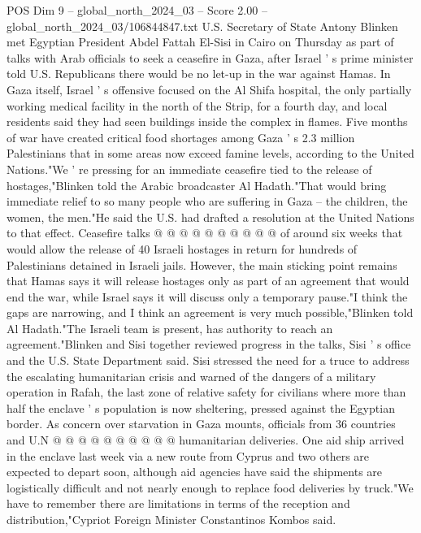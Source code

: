 \begin{textsample}{POS Dim 9 – global\_north\_2024\_03 – Score 2.00 – global\_north\_2024\_03/106844847.txt}  \label{ex:f9_pos_199}
U.S.
Secretary of State Antony Blinken met Egyptian President Abdel Fattah El-Sisi in Cairo on Thursday as part of talks with Arab officials to seek a ceasefire in Gaza, after Israel ' s prime minister told U.S.
Republicans there would be no let-up in the war against Hamas.
In Gaza itself, Israel ' s offensive focused on the Al Shifa hospital, the only partially working medical facility in the north of the Strip, for a fourth day, and local residents said they had seen buildings inside the complex in flames.
Five months of war have created critical food shortages among Gaza ' s 2.3 million Palestinians that in some areas now exceed famine levels, according to the United Nations."We ' re pressing for an immediate ceasefire tied to the release of hostages,"Blinken told the Arabic broadcaster Al Hadath."That would bring immediate relief to so many people who are suffering in Gaza -- the children, the women, the men."He said the U.S. had drafted a resolution at the United Nations to that effect.
Ceasefire talks @ @ @ @ @ @ @ @ @ @ of around six weeks that would allow the release of 40 Israeli hostages in return for hundreds of Palestinians detained in Israeli jails.
However, the main sticking point remains that Hamas says it will release hostages only as part of an agreement that would end the war, while Israel says it will discuss only a temporary pause."I think the gaps are narrowing, and I think an agreement is very much possible,"Blinken told Al Hadath."The Israeli team is present, has authority to reach an agreement."Blinken and Sisi together reviewed progress in the talks, Sisi ' s office and the U.S.
State Department said.
Sisi stressed the need for a truce to address the escalating humanitarian crisis and warned of the dangers of a military operation in Rafah, the last zone of relative safety for civilians where more than half the enclave ' s population is now sheltering, pressed against the Egyptian border.
As concern over starvation in Gaza mounts, officials from 36 countries and U.N @ @ @ @ @ @ @ @ @ @ humanitarian deliveries.
One aid ship arrived in the enclave last week via a new route from Cyprus and two others are expected to depart soon, although aid agencies have said the shipments are logistically difficult and not nearly enough to replace food deliveries by truck."We have to remember there are limitations in terms of the reception and distribution,"Cypriot Foreign Minister Constantinos Kombos said.

\end{textsample}
